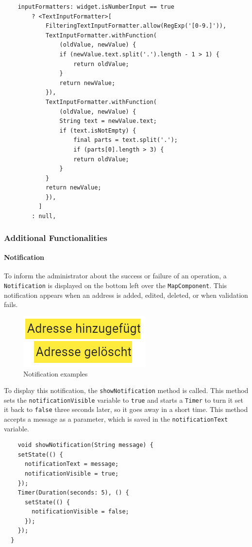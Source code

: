 \lstset{style=mycsharp, caption=InputFormatter in Inputfield}
\begin{lstlisting}
    inputFormatters: widget.isNumberInput == true
        ? <TextInputFormatter>[
            FilteringTextInputFormatter.allow(RegExp('[0-9.]')),
            TextInputFormatter.withFunction(
                (oldValue, newValue) {
                if (newValue.text.split('.').length - 1 > 1) {
                    return oldValue;
                }
                return newValue;
            }),
            TextInputFormatter.withFunction(
                (oldValue, newValue) {
                String text = newValue.text;
                if (text.isNotEmpty) {
                    final parts = text.split('.');
                    if (parts[0].length > 3) {
                    return oldValue;
                }
            }
            return newValue;
            }),
          ]
        : null,
\end{lstlisting}



\subsubsection{Additional Functionalities}


\label{fig:Notification}
\paragraph{Notification}
To inform the administrator about the success or failure of an operation, a \texttt{Notification} is displayed on the bottom left over the \texttt{MapComponent}. This notification appears when an address is added, edited, deleted, or when validation fails.


\begin{figure}[H]
    \centering
    \includegraphics[width=0.4\linewidth]{images/AdminPanel/NotificationExamples.png}
    \caption{Notification examples}
\end{figure}

To display this notification, the \texttt{showNotification} method is called. This method sets the \texttt{notificationVisible} variable to \texttt{true} and starts a \texttt{Timer} to turn it set it back to \texttt{false} three seconds later, so it goes away in a short time. This method accepts a message as a parameter, which is saved in the \texttt{notificationText} variable.
\lstset{style=mycsharp, caption=showNotification method}
\begin{lstlisting}
    void showNotification(String message) {
    setState(() {
      notificationText = message;
      notificationVisible = true;
    }); 
    Timer(Duration(seconds: 5), () {
      setState(() {
        notificationVisible = false;
      });
    });
  }
\end{lstlisting}

